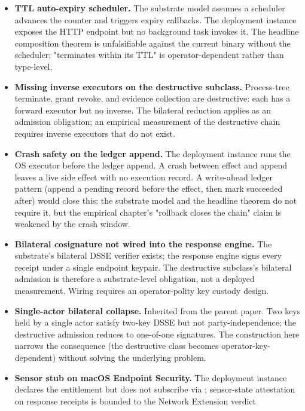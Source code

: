 \begin{itemize}
  \item \textbf{TTL auto-expiry scheduler.} The substrate model
    assumes a scheduler advances the counter and triggers expiry
    callbacks. The deployment instance exposes the
     HTTP endpoint but no background task invokes
    it. The headline composition theorem is unfalsifiable against the
    current binary without the scheduler; "terminates within its TTL"
    is operator-dependent rather than type-level.
  \item \textbf{Missing inverse executors on the destructive subclass.}
    Process-tree terminate, grant revoke, and evidence collection are
    destructive: each has a forward executor but no inverse. The
    bilateral reduction applies as an admission obligation; an
    empirical measurement of the destructive chain requires inverse
    executors that do not exist.
  \item \textbf{Crash safety on the ledger append.} The deployment
    instance runs the OS executor before the ledger append. A crash
    between effect and append leaves a live side effect with no
    execution record. A write-ahead ledger pattern (append a pending
    record before the effect, then mark succeeded after) would close
    this; the substrate model and the headline theorem do not require
    it, but the empirical chapter's "rollback closes the chain" claim
    is weakened by the crash window.
  \item \textbf{Bilateral cosignature not wired into the response
    engine.} The substrate's bilateral DSSE verifier exists; the
    response engine signs every receipt under a single endpoint
    keypair. The destructive subclass's bilateral admission is
    therefore a substrate-level obligation, not a deployed
    measurement. Wiring requires an operator-polity key custody
    design.
  \item \textbf{Single-actor bilateral collapse.} Inherited from the
    parent paper. Two keys held by a single actor satisfy two-key
    DSSE but not party-independence; the destructive admission
    reduces to one-of-one signatures. The construction here narrows
    the consequence (the destructive class becomes operator-key-
    dependent) without solving the underlying problem.
  \item \textbf{Sensor stub on macOS Endpoint Security.} The
    deployment instance declares the entitlement but does not
    subscribe via ; sensor-state attestation
    on response receipts is bounded to the Network Extension verdict

\end{itemize}
